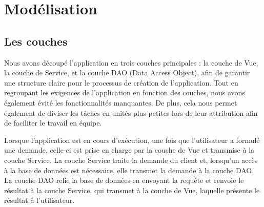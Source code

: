 \documentclass[11pt]{article}
\begin{document}
\newpage
\section{Modélisation}




\subsection{Les couches}

Nous avons découpé l'application en trois couches principales : la couche de Vue, la couche de Service, et la couche DAO (Data Access Object), afin de garantir une structure claire pour le processus de création de l'application. Tout en regroupant les exigences de l'application en fonction des couches, nous avons également évité les fonctionnalités manquantes. De plus, cela nous permet également de diviser les tâches en unités plus petites lors de leur attribution afin de faciliter le travail en équipe.

Lorsque l'application est en cours d'exécution, une fois que l'utilisateur a formulé une demande, celle-ci est prise en charge par la couche de Vue et transmise à la couche Service. La couche Service traite la demande du client et, lorsqu'un accès à la base de données est nécessaire, elle transmet la demande à la couche DAO. La couche DAO relie la base de données en envoyant la requête et renvoie le résultat à la couche Service, qui transmet à la couche de Vue, laquelle présente le résultat à l'utilisateur.
\end{document}
